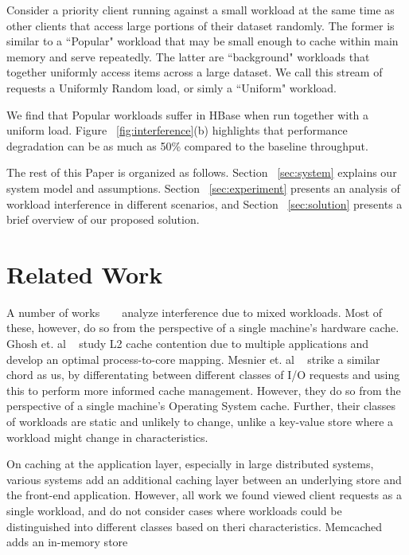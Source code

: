 \documentclass[twocolumn]{article}
\begin{document}
\begin{enumerate}
Consider a priority client running against a small workload at the same time as other clients that access large portions of their dataset randomly. The former is similar to a ``Popular" workload that may be small enough to cache within main memory and serve repeatedly. The latter are ``background" workloads that together uniformly access items across a large dataset. We call this stream of requests a Uniformly Random load, or simly a ``Uniform" workload. 

We find that Popular workloads suffer in HBase when run together with a uniform load. Figure ~\ref{fig:interference}(b) highlights that performance degradation can be as much as 50\% compared to the baseline throughput.

\end{enumerate}


The rest of this Paper is organized as follows. Section ~\ref{sec:system} explains our system model and assumptions.  Section ~\ref{sec:experiment} presents an analysis of workload interference in different scenarios, and Section ~\ref{sec:solution} presents a brief overview of our proposed solution. %

\section{Related Work}
\label{sec:related-work}
A number of works ~\citep{Ghosh:2011:SSS:2066302.2066917} ~\cite{Mesnier:2011:DSS:1945023.1945030} analyze interference due to mixed workloads. Most of these, however, do so from the perspective of a single machine's hardware cache. Ghosh et. al ~\cite{Ghosh:2011:SSS:2066302.2066917} study L2 cache contention due to multiple applications and develop an optimal  process-to-core mapping. Mesnier et. al ~\cite{Mesnier:2011:DSS:1945023.1945030} strike a similar chord as us, by differentating between different classes of I/O requests and using this to perform more informed cache management. However, they do so from the perspective of a single machine's Operating System cache. Further, their classes of workloads are static and unlikely to change, unlike a key-value store where a workload might change in characteristics.

On caching at the application layer, especially in large distributed systems, various systems add an additional caching layer between an underlying store and the front-end application. However, all work we found viewed client requests as a single workload, and do not consider cases where workloads could be distinguished into different classes based on theri characteristics.
Memcached ~\cite{Fitzpatrick:2004:DCM:1012889.1012894} adds an in-memory store
\end{document}
